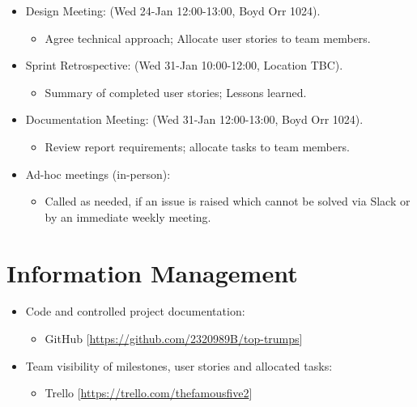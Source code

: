 \documentclass[a4paper, 12pt, titlepage]{article}
\begin{document}
\begin{itemize}
        \item Design Meeting: (Wed 24-Jan 12:00-13:00, Boyd Orr 1024).
        \begin{itemize}
                \item Agree technical approach; Allocate user stories to team members.
        \end{itemize}

        \item Sprint Retrospective: (Wed 31-Jan 10:00-12:00, Location TBC).
        \begin{itemize}
                \item Summary of completed user stories; Lessons learned.
        \end{itemize}

        \item Documentation Meeting: (Wed 31-Jan 12:00-13:00, Boyd Orr 1024).
        \begin{itemize}
                \item Review report requirements; allocate tasks to team members.
        \end{itemize}

        \item Ad-hoc meetings (in-person):
        \begin{itemize}
            \item Called as needed, if an issue is raised which cannot be solved via Slack or by an immediate weekly meeting.
        \end{itemize}
    \end{itemize}


    \section{Information Management}
    \begin{itemize}
        \item Code and controlled project documentation:
        \begin{itemize}
            \item GitHub [\url{https://github.com/2320989B/top-trumps}]
        \end{itemize}

        \item Team visibility of milestones, user stories and allocated tasks:
        \begin{itemize}
            \item Trello [\url{https://trello.com/thefamousfive2}]
        \end{itemize}
    \end{itemize}
\end{document}
